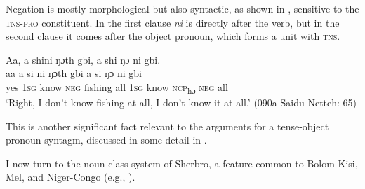 Negation is mostly morphological but also syntactic, as shown in , sensitive to the \textsc{tns-pro} constituent. In the first clause \textit{ni} is directly after the verb, but in the second clause it comes after the object pronoun, which forms a unit with \textsc{tns}.

\ea%
    \label{ex:134}
    Aa, a shini ŋɔth gbi, a shi ŋɔ ni gbi.\\
    \gll aa    a    si      ni    ŋɔth    gbi  a    si      ŋɔ      ni    gbi\\
    yes  \textsc{1sg}  know    \textsc{neg}  fishing  all    \textsc{1sg}  know    \textsc{ncp}\textsubscript{hɔ}    \textsc{neg}  all\\
    \glt ‘Right, I don't know fishing at all, I don't know it at all.' (090a Saidu Netteh: 65)
\z

This is another significant fact relevant to the arguments for a tense-object pronoun syntagm, discussed in some detail in .

I now turn to the noun class system of Sherbro, a feature common to Bolom-Kisi, Mel, and Niger-Congo (e.g., \citealt{Childs2003b}).


